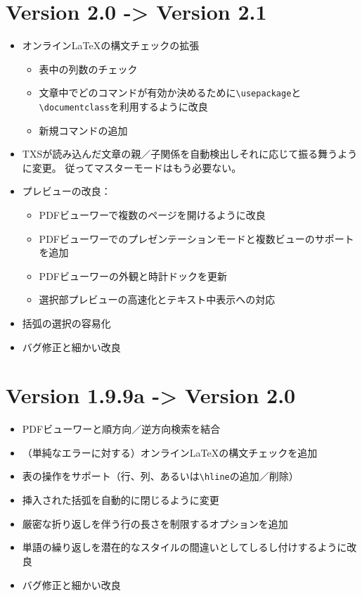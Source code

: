 \section{Version 2.0 -\textgreater{} Version 2.1}

\begin{itemize}
\item
  オンラインLaTeXの構文チェックの拡張

  \begin{itemize}
  \item
    表中の列数のチェック
  \item
    文章中でどのコマンドが有効か決めるために\verb+\usepackage+と
    \verb+\documentclass+を利用するように改良
  \item
    新規コマンドの追加
  \end{itemize}
\item
  TXSが読み込んだ文章の親／子関係を自動検出しそれに応じて振る舞うように変更。
  従ってマスターモードはもう必要ない。
\item
  プレビューの改良：

  \begin{itemize}
  \item
    PDFビューワーで複数のページを開けるように改良
  \item
    PDFビューワーでのプレゼンテーションモードと複数ビューのサポートを追加
  \item
    PDFビューワーの外観と時計ドックを更新
  \item
    選択部プレビューの高速化とテキスト中表示への対応
  \end{itemize}
\item
  括弧の選択の容易化
\item
  バグ修正と細かい改良
\end{itemize}

\section{Version 1.9.9a -\textgreater{} Version 2.0}

\begin{itemize}
\item
  PDFビューワーと順方向／逆方向検索を結合
\item
  （単純なエラーに対する）オンラインLaTeXの構文チェックを追加
\item
  表の操作をサポート（行、列、あるいは\verb+\hline+の追加／削除）
\item
  挿入された括弧を自動的に閉じるように変更
\item
  厳密な折り返しを伴う行の長さを制限するオプションを追加
\item
  単語の繰り返しを潜在的なスタイルの間違いとしてしるし付けするように改良
\item
  バグ修正と細かい改良
\end{itemize}

